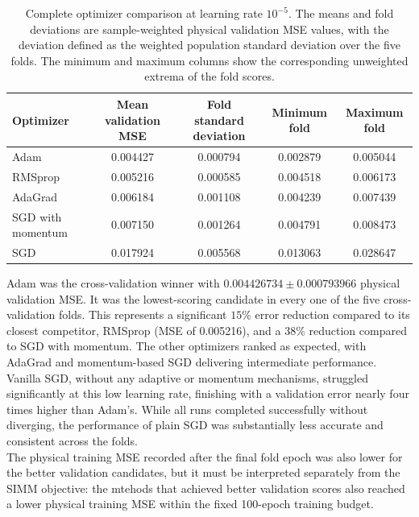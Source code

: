 \begin{table}[h!]
    \centering
    \begin{tabular}{lcccc}
        \hline
        Optimizer & Mean validation MSE & Fold standard deviation & Minimum fold & Maximum fold \\
        \hline
        Adam & 0.004427 & 0.000794 & 0.002879 & 0.005044 \\
        RMSprop & 0.005216 & 0.000585 & 0.004518 & 0.006173 \\
        AdaGrad & 0.006184 & 0.001108 & 0.004239 & 0.007439 \\
        SGD with momentum & 0.007150 & 0.001264 & 0.004791 & 0.008473 \\
        SGD & 0.017924 & 0.005568 & 0.013063 & 0.028647 \\
        \hline
    \end{tabular}
    \caption{Complete optimizer comparison at learning rate $10^{-5}$. The means and fold deviations are sample-weighted physical validation MSE values, with the deviation defined as the weighted population standard deviation over the five folds. The minimum and maximum columns show the corresponding unweighted extrema of the fold scores.}
    \label{tab:04_optimizer_results}
\end{table}
Adam was the cross-validation winner with $0.004426734\pm0.000793966$ physical validation MSE. It was the lowest-scoring candidate in every one of the five cross-validation folds. This represents a significant $15\%$ error reduction compared to its closest competitor, RMSprop (MSE of 0.005216), and a $38\%$ reduction compared to SGD with momentum. The other optimizers ranked as expected, with AdaGrad and momentum-based SGD delivering intermediate performance. Vanilla SGD, without any adaptive or momentum mechanisms, struggled significantly at this low learning rate, finishing with a validation error nearly four times higher than Adam's. While all runs completed successfully without diverging, the performance of plain SGD was substantially less accurate and consistent across the folds.\\

The physical training MSE recorded after the final fold epoch was also lower for the better validation candidates, but it must be interpreted separately from the SIMM objective: the mtehods that achieved better validation scores also reached a lower physical training MSE within the fixed 100-epoch training budget.\\

